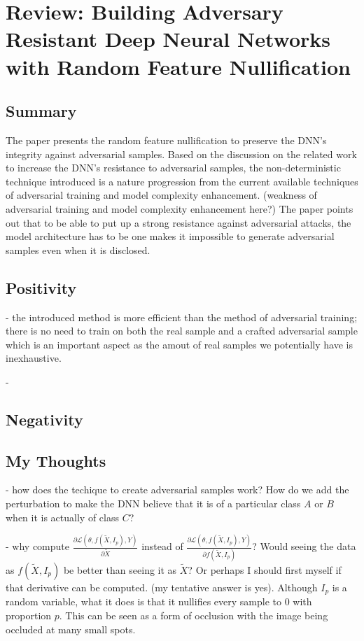 \documentclass[a4paper,10pt]{article}
\theoremstyle{definition}
\begin{document}
\section*{Review: Building Adversary Resistant Deep Neural Networks with Random Feature Nullification}
\subsection*{Summary}
The paper presents the random feature nullification to preserve the DNN's integrity against adversarial samples. Based on the discussion on the related work to increase the DNN's resistance to adversarial samples, the non-deterministic technique introduced is a nature progression from the current available techniques of adversarial training and model complexity enhancement. (weakness of adversarial training and model complexity enhancement here?) The paper points out that to be able to put up a strong resistance against adversarial attacks, the model architecture has to be one makes it impossible to generate adversarial samples even when it is disclosed.





\subsection*{Positivity}

- the introduced method is more efficient than the method of adversarial training; there is no need to train on both the real sample and a crafted adversarial sample which is an important aspect as the amout of real samples we potentially have is inexhaustive.

- 


\subsection*{Negativity}

\subsection*{My Thoughts}
- how does the techique to create adversarial samples work? How do we add the perturbation to make the DNN believe that it is of a particular class $A$ or $B$ when it is actually of class $C$?


- why compute  $\frac{\partial \mathcal{L}(\theta, f(\tilde{X},I_p),Y)}{\partial \tilde{X}}$ instead of  $\frac{\partial \mathcal{L}(\theta, f(\tilde{X},I_p),Y)}{\partial  f(\tilde{X},I_p)}$? Would seeing the data as $f(\tilde{X},I_p)$  be better than seeing it as $\tilde{X}$? Or perhaps I should first myself if that derivative can be computed. (my tentative answer is yes). Although $I_p$ is a random variable, what it does is that it nullifies every sample to 0 with proportion $p$. This can be seen as a form of occlusion with the image being occluded at many small spots.
\end{document}
